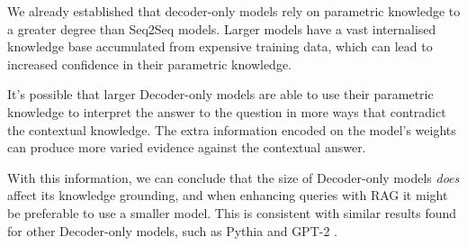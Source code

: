 We already established that decoder-only models rely on parametric knowledge to a greater degree than Seq2Seq models.
Larger models have a vast internalised knowledge base accumulated from expensive training data, which can lead to increased confidence in their parametric knowledge.

It's possible that larger Decoder-only models are able to use their parametric knowledge to interpret the answer to the question in more ways that contradict the contextual knowledge.
The extra information encoded on the model's weights can produce more varied evidence against the contextual answer.

With this information, we can conclude that the size of Decoder-only models \textit{does} affect its knowledge grounding, and when enhancing queries with RAG it might be preferable to use a smaller model.
This is consistent with similar results found for other Decoder-only models, such as Pythia and GPT-2 \cite{factual_recall}.


